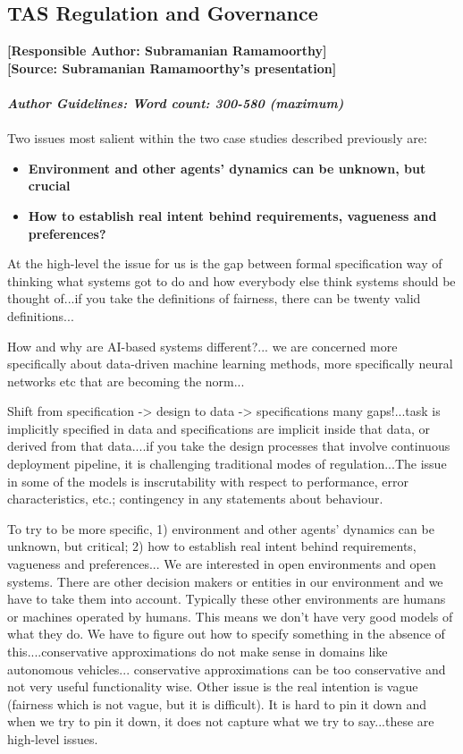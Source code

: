 \documentclass[sigconf]{acmart}
\begin{document}
\subsection{TAS Regulation and Governance}
\noindent\textbf{[Responsible Author:  Subramanian Ramamoorthy]}\\
\noindent\textbf{[Source: Subramanian Ramamoorthy's presentation]}\\\\
\noindent\textbf{\textit{Author Guidelines: Word count: 300-580 (maximum)}}\\\\
Two issues most salient within the two case studies described previously are:
\begin{itemize}
	\item \textbf{Environment and other agents' dynamics can be unknown, but crucial}
	\item \textbf{How to establish real intent behind requirements, vagueness and preferences?}
\end{itemize}

At the high-level the issue for us is the gap between formal specification way of thinking what systems got to do and how everybody else think systems should be thought of...if you take the definitions of fairness, there can be twenty valid definitions...

How and why are AI-based systems different?... we are concerned more specifically about data-driven machine learning methods, more specifically neural networks etc that are becoming the norm...

Shift from specification -> design to data -> specifications many gaps!...task is implicitly specified in data and specifications are implicit inside that data, or derived from that data....if you take the design processes that involve continuous deployment pipeline, it is challenging traditional modes of regulation...The issue in some of the models is inscrutability with respect to performance, error characteristics, etc.; contingency in any statements about behaviour.

To try to be more specific, 1) environment and other agents' dynamics can be unknown, but critical; 2) how to establish real intent behind requirements, vagueness and preferences...
We are interested in open environments and open systems. There are other decision makers or entities in our environment and we have to take them into account. Typically these other environments are humans or machines operated by humans. This means we don't have very good models of what they do. We have to figure out how to specify something in the absence of this....conservative approximations do not make sense in domains like autonomous vehicles... conservative approximations can be too conservative and not very useful functionality wise. Other issue is the real intention is vague (fairness which is not vague, but it is difficult). It is hard to pin it down and when we try to pin it down, it does not capture what we try to say...these are high-level issues.
\end{document}
